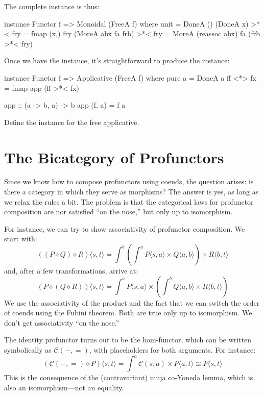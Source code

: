 \documentclass[DaoFP]{subfiles}
\begin{document}
The complete instance is thus:
\begin{haskell}
instance Functor f => Monoidal (FreeA f) where
  unit = DoneA ()
  (DoneA x) >*< fry = fmap (x,) fry
  (MoreA abx fa frb) >*< fry = MoreA (reassoc abx) fa (frb >*< fry)
\end{haskell}

Once we have the  instance, it's straightforward to produce the  instance:
\begin{haskell}
instance Functor f => Applicative (FreeA f) where
  pure a = DoneA a
  ff <*> fx = fmap app (ff >*< fx)
  
app :: (a -> b, a) -> b
app (f, a) = f a
\end{haskell}

\begin{exercise}
Define the  instance for the free applicative.
\end{exercise}


\section{The Bicategory of Profunctors}

Since we know how to compose profunctors using coends, the question arises: is there a category in which they serve as morphisms? The answer is yes, as long as we relax the rules a bit. The problem is that the categorical laws for profunctor composition are nor satisfied ``on the nose,'' but only up to isomorphism. 

For instance, we can try to show associativity of profunctor composition. We start with:
\[ ((P \diamond Q) \diamond R) \langle s, t \rangle = \int^b \left( \int^a P \langle s, a \rangle \times Q \langle a, b \rangle \right) \times R \langle b,  t \rangle \]
and, after a few transformations, arrive at:
\[ (P \diamond (Q \diamond R)) \langle s, t \rangle =  \int^a P \langle s, a \rangle \times \left( \int^b Q \langle a, b \rangle \times R \langle b,  t \rangle \right) \]
We use the associativity of the product and the fact that we can switch the order of coends using the Fubini theorem. Both are true only up to isomorphism. We don't get associativity ``on the nose.''

The identity profunctor turns out to be the hom-functor, which can be written symbolically as $\mathcal{C}(-, =)$, with placeholders for both arguments. For instance:
\[ \left( \mathcal{C}(-, =) \diamond P \right) \langle s, t \rangle = \int^a  \mathcal{C}(s, a) \times P \langle a, t \rangle \cong P \langle s, t \rangle \]
This is the consequence of the (contravariant) ninja co-Yoneda lemma, which is also an isomorphism---not an equality.
\end{document}
